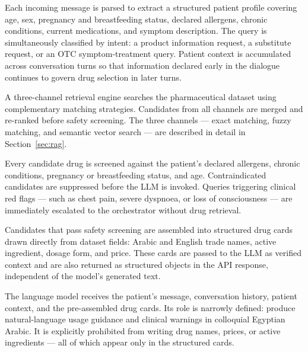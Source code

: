 \documentclass[12pt,a4paper]{article}
\begin{document}
\begin{description}[leftmargin=0em, style=nextline]

    \item[\textbf{Query Understanding}]
        Each incoming message is parsed to extract a structured patient
        profile covering age, sex, pregnancy and breastfeeding status,
        declared allergens, chronic conditions, current medications, and
        symptom description. The query is simultaneously classified by
        intent: a product information request, a substitute request, or
        an OTC symptom-treatment query. Patient context is accumulated
        across conversation turns so that information declared early in
        the dialogue continues to govern drug selection in later turns.

    \item[\textbf{Hybrid Retrieval Engine}]
        A three-channel retrieval engine searches the pharmaceutical
        dataset using complementary matching strategies. Candidates from
        all channels are merged and re-ranked before safety screening.
        The three channels --- exact matching, fuzzy matching, and
        semantic vector search --- are described in detail in
        Section~\ref{sec:rag}.

    \item[\textbf{Safety Layer}]
        Every candidate drug is screened against the patient's declared
        allergens, chronic conditions, pregnancy or breastfeeding status,
        and age. Contraindicated candidates are suppressed before the LLM
        is invoked. Queries triggering clinical red flags --- such as chest
        pain, severe dyspnoea, or loss of consciousness --- are immediately
        escalated to the orchestrator without drug retrieval.

    \item[\textbf{Response Grounding}]
        Candidates that pass safety screening are assembled into structured
        drug cards drawn directly from dataset fields: Arabic and English
        trade names, active ingredient, dosage form, and price. These
        cards are passed to the LLM as verified context and are also
        returned as structured objects in the API response, independent
        of the model's generated text.

    \item[\textbf{LLM Guidance Layer}]
        The language model receives the patient's message, conversation
        history, patient context, and the pre-assembled drug cards. Its
        role is narrowly defined: produce natural-language usage guidance
        and clinical warnings in colloquial Egyptian Arabic. It is
        explicitly prohibited from writing drug names, prices, or active
        ingredients --- all of which appear only in the structured cards.


\end{description}
\end{document}
